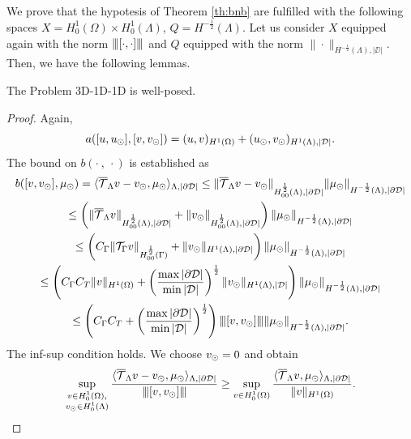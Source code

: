 \documentclass[r]{siamart171218}
\begin{document}
We prove that the hypotesis of  Theorem \ref{th:bnb} are fulfilled with the following spaces $X=H^1_0(\Omega) \times H^1_0(\Lambda)$, $Q=H^{-\frac 12}(\Lambda)$.
Let us consider $X$ equipped again with the norm ${\left\vert\kern-0.25ex\left\vert\kern-0.25ex\left\vert [\cdot,\cdot ] \right\vert\kern-0.25ex\right\vert\kern-0.25ex\right\vert}$ and  
$Q$ equipped with the norm $\|\cdot \|_{H^{-\frac 12}(\Lambda),|\DD|}$.
Then, we have the following lemmas.
\begin{lemma}
The Problem 3D-1D-1D is well-posed.
\end{lemma}
\begin{proof}
Again, 
\begin{equation*}
a([u, u_{\odot}], [v, v_{\odot}]) = (u,v)_{H^1(\Omega)} + (u_{\odot}, v_{\odot})_{H^1(\Lambda), |\mathcal{D}|}.
\end{equation*}
The bound on $b(\cdot \ , \ \cdot)$ is established as
\begin{multline*}
b([v, v_{\odot}], \mu_{\odot})=  \langle  {\overline{\mathcal{T}}_\Lambda} v - v_{\odot}, \mu_{\odot} \rangle_{\Lambda, |\partial\mathcal{D}|} 
\leq \|{\overline{\mathcal{T}}_\Lambda} v - v_{\odot}\|_{H^{\frac 12 }_{00}(\Lambda), |\partial\mathcal{D}|}\|\mu_{\odot}\|_{H^{-\frac 12}(\Lambda),|\partial\mathcal{D}|}\\
\leq \left(\|{\overline{\mathcal{T}}_\Lambda} v\|_{H^{\frac 12 }_{00}(\Lambda), |\partial\mathcal{D}|}+\|v_{\odot}\|_{H^{\frac 12 }_{00}(\Lambda), |\partial\mathcal{D}|}\right)\|\mu_{\odot}\|_{H^{-\frac 12}(\Lambda),|\partial\mathcal{D}|}\\
\leq \left(C_\Gamma \|{\mathcal{T}_\Gamma} v\|_{H^{\frac 12 }_{00}(\Gamma)}+ \|v_{\odot}\|_{H^1(\Lambda), |\partial\mathcal{D}|}\right)\|\mu_{\odot}\|_{H^{-\frac 12}(\Lambda),|\partial\mathcal{D}|} \\
\leq \left(C_\Gamma C_T\|v\|_{H^1(\Omega)}+ \left(\frac{\max |\partial\mathcal{D}|}{\min |\mathcal{D}|}\right)^{\frac 12} \|v_{\odot}\|_{H^1(\Lambda), |\mathcal{D}|}\right) \|\mu_{\odot}\|_{H^{-\frac 12}(\Lambda),|\partial\mathcal{D}|} \\
\leq  \left( C_\Gamma C_T + \left(\frac{\max |\partial\mathcal{D}|}{\min |\mathcal{D}|}\right)^{\frac 12} \right) {\left\vert\kern-0.25ex\left\vert\kern-0.25ex\left\vert [v,v_{\odot}] \right\vert\kern-0.25ex\right\vert\kern-0.25ex\right\vert}\|\mu_{\odot}\|_{H^{-\frac 12}(\Lambda),|\partial\mathcal{D}|}.
\end{multline*} 
The inf-sup condition holds. 
We choose $v_{\odot}=0$ and obtain
\begin{equation*}
\sup _{\substack{v\in H^1_0(\Omega),\\ v_{\odot} \in H^1_0(\Lambda)}} \frac{ \langle {\overline{\mathcal{T}}_\Lambda} v - v_{\odot}, \mu_{\odot} \rangle_{\Lambda,|\partial\mathcal{D}|}}{{\left\vert\kern-0.25ex\left\vert\kern-0.25ex\left\vert [v,v_{\odot}] \right\vert\kern-0.25ex\right\vert\kern-0.25ex\right\vert}}
\geq \sup _{v\in H^1_0(\Omega)} \frac{ \langle {\overline{\mathcal{T}}_\Lambda} v, \mu_{\odot} \rangle_{\Lambda,|\partial\mathcal{D}|}}{\|v\|_{H^1(\Omega)}}. 
\end{equation*}


\end{proof}
\end{document}
